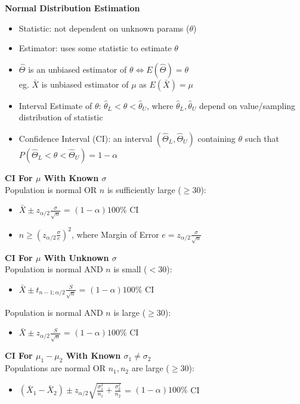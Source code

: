 \documentclass[a4paper, 12pt]{article}
\begin{document}
\begin{multicols*}{4}
{\small\textbf{Normal Distribution Estimation}}
\begin{itemize}
    \item Statistic: not dependent on unknown params ($\theta$)
    \item Estimator: uses some statistic to estimate $\theta$
    \item $\hat{\Theta}$ is an unbiased estimator of $\theta \iff E(\hat{\Theta})=\theta$ \\
        eg. $\bar{X}$ is unbiased estimator of $\mu$ as $E(\bar{X})=\mu$
    \item Interval Estimate of $\theta$: $\hat{\theta}_L<\theta<\hat{\theta}_U$, where $\hat{\theta}_L,\hat{\theta}_U$ depend on value/sampling distribution of statistic
    \item Confidence Interval (CI): an interval $(\hat{\Theta}_L,\hat{\Theta}_U)$ containing $\theta$ such that $P(\hat{\Theta}_L<\theta<\hat{\Theta}_U)=1-\alpha$
\end{itemize}
\textbf{CI For $\mu$ With Known $\sigma$} \\
Population is normal OR $n$ is sufficiently large ($\geq 30$):
\begin{itemize}
    \item $\bar{X}\pm z_{\alpha/2}\frac{\sigma}{\sqrt{n}}$ = $(1-\alpha)100\%$ CI
    \item $n \geq (z_{\alpha/2}\frac{\sigma}{e})^2$, where Margin of Error $e = z_{\alpha/2}\frac{\sigma}{\sqrt{n}}$
\end{itemize}
\textbf{CI For $\mu$ With Unknown $\sigma$} \\
Population is normal AND $n$ is small ($< 30$):
\begin{itemize}
    \item $\bar{X}\pm t_{n-1;\alpha/2}\frac{S}{\sqrt{n}}$ = $(1-\alpha)100\%$ CI
\end{itemize}
Population is normal AND $n$ is large ($\geq 30$):
\begin{itemize}
    \item $\bar{X}\pm z_{\alpha/2}\frac{S}{\sqrt{n}}$ = $(1-\alpha)100\%$ CI
\end{itemize}
\textbf{CI For $\mu_1-\mu_2$ With Known $\sigma_1 \neq \sigma_2$} \\
Populations are normal OR $n_1,n_2$ are large ($\geq 30$):
\begin{itemize}
    \item $(\bar{X}_1 - \bar{X}_2) \pm z_{\alpha/2}\sqrt{\frac{\sigma_1^2}{n_1}+\frac{\sigma_2^2}{n_2}}$ = $(1-\alpha)100\%$ CI
\end{itemize}

\end{multicols*}
\end{document}
